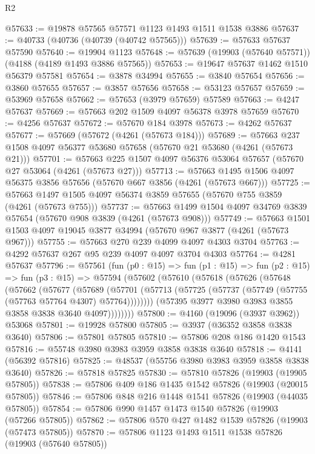\begin{lexlean}{R2}
\begin{coremodule}
@57633 := @19878 @57565 @57571 @1123 @1493 @1511 @1538 @3886
@57637 := @40733 (@40736 (@40739 (@40742 @57565)))
@57639 := @57633 @57637 @57590
@57640 := @19904 @1123
@57648 := @57639 (@19903 (@57640 @57571)) (@4188 (@4189 @1493 @3886 @57565))
@57653 := @19647 @57637 @1462 @1510 @56379 @57581
@57654 := @3878 @34994
@57655 := @3840 @57654
@57656 := @3860 @57655
@57657 := @3857 @57656
@57658 := @53123 @57657
@57659 := @53969 @57658
@57662 := @57653 (@3979 @57659) @57589
@57663 := @4247 @57637
@57669 := @57663 @202 @1509 @4097 @56378 @3978 @57659
@57670 := @4256 @57637
@57672 := @57670 @184 @3978
@57673 := @4262 @57637
@57677 := @57669 (@57672 (@4261 (@57673 @184)))
@57689 := @57663 @237 @1508 @4097 @56377 @53680 @57658 (@57670 @21 @53680 (@4261 (@57673 @21)))
@57701 := @57663 @225 @1507 @4097 @56376 @53064 @57657 (@57670 @27 @53064 (@4261 (@57673 @27)))
@57713 := @57663 @1495 @1506 @4097 @56375 @3856 @57656 (@57670 @667 @3856 (@4261 (@57673 @667)))
@57725 := @57663 @1497 @1505 @4097 @56374 @3859 @57655 (@57670 @755 @3859 (@4261 (@57673 @755)))
@57737 := @57663 @1499 @1504 @4097 @34769 @3839 @57654 (@57670 @908 @3839 (@4261 (@57673 @908)))
@57749 := @57663 @1501 @1503 @4097 @19045 @3877 @34994 (@57670 @967 @3877 (@4261 (@57673 @967)))
@57755 := @57663 @270 @239 @4099 @4097 @4303 @3704
@57763 := @4292 @57637 @267 @95 @239 @4097 @4097 @3704 @4303
@57764 := @4281 @57637
@57796 := @57561
    (fun (p0 : @15) =>
    fun (p1 : @15) =>
    fun (p2 : @15) =>
    fun (p3 : @15) =>
    @57594
      (@57602
        (@57610
          (@57618
            (@57626
              (@57648
                (@57662
                  (@57677
                    (@57689
                      (@57701
                        (@57713 (@57725 (@57737 (@57749 (@57755 (@57763 @57764 @4307) @57764))))))))
                  (@57395 @3977 @3980 @3983 @3855 @3858 @3838 @3640 @4097))))))))
@57800 := @4160 (@19096 (@3937 @3962)) @53068
@57801 := @19928 @57800
@57805 := @3937 (@36352 @3858 @3838 @3640)
@57806 := @57801 @57805
@57810 := @57806 @208 @186 @1420 @1543
@57816 := @55748 @3980 @3983 @3959 @3858 @3838 @3640
@57818 := @4141 (@56392 @57816)
@57825 := @48537 (@55756 @3980 @3983 @3959 @3858 @3838 @3640)
@57826 := @57818 @57825
@57830 := @57810 @57826 (@19903 (@19905 @57805))
@57838 := @57806 @409 @186 @1435 @1542 @57826 (@19903 (@20015 @57805))
@57846 := @57806 @848 @216 @1448 @1541 @57826 (@19903 (@44035 @57805))
@57854 := @57806 @990 @1457 @1473 @1540 @57826 (@19903 (@57266 @57805))
@57862 := @57806 @570 @427 @1482 @1539 @57826 (@19903 (@57473 @57805))
@57870 := @57806 @1123 @1493 @1511 @1538 @57826 (@19903 (@57640 @57805))

\end{coremodule}
\end{lexlean}
